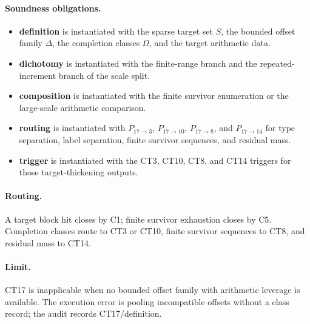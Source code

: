 \documentclass[
  11pt,
]{article}
\providecommand{\tightlist}{%
  \setlength{\itemsep}{0pt}\setlength{\parskip}{0pt}}
\theoremstyle{definition}
\newcommand{\ctpar}[1]{\paragraph{#1.}}
\begin{document}
\ctpar{Soundness obligations}
\begin{itemize}
\tightlist
\item \textbf{definition} is instantiated with the sparse target set \(S\), the bounded offset family \(\Delta\), the completion classes \(\Omega\), and the target arithmetic data.
\item \textbf{dichotomy} is instantiated with the finite-range branch and the repeated-increment branch of the scale split.
\item \textbf{composition} is instantiated with the finite survivor enumeration or the large-scale arithmetic comparison.
\item \textbf{routing} is instantiated with \(P_{17\to3}\), \(P_{17\to10}\), \(P_{17\to8}\), and \(P_{17\to14}\) for type separation, label separation, finite survivor sequences, and residual mass.
\item \textbf{trigger} is instantiated with the CT3, CT10, CT8, and CT14 triggers for those target-thickening outputs.
\end{itemize}

\ctpar{Routing}
A target block hit closes by C1; finite survivor exhaustion closes by
C5.  Completion classes route to
CT3 or CT10, finite survivor sequences to CT8, and residual mass to CT14.

\ctpar{Limit}
CT17 is inapplicable when no bounded offset family with arithmetic leverage
is available. The execution error is pooling incompatible offsets without a
class record; the audit records CT17/definition.
\end{document}
